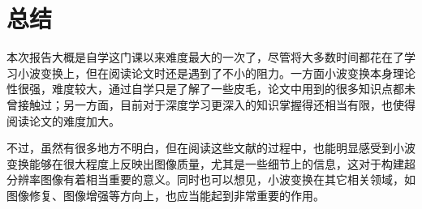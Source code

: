 \documentclass[UTF8]{ctexart}
\begin{document}
        

            


	\section{总结}
    
		\indent 本次报告大概是自学这门课以来难度最大的一次了，尽管将大多数时间都花在了学习小波变换上，但在阅读论文时还是遇到了不小的阻力。一方面小波变换本身理论性很强，难度较大，通过自学只是了解了一些皮毛，论文中用到的很多知识点都未曾接触过；另一方面，目前对于深度学习更深入的知识掌握得还相当有限，也使得阅读论文的难度加大。
        
        \indent 不过，虽然有很多地方不明白，但在阅读这些文献的过程中，也能明显感受到小波变换能够在很大程度上反映出图像质量，尤其是一些细节上的信息，这对于构建超分辨率图像有着相当重要的意义。同时也可以想见，小波变换在其它相关领域，如图像修复、图像增强等方向上，也应当能起到非常重要的作用。
		

		
	
	
%
%

\end{document}
